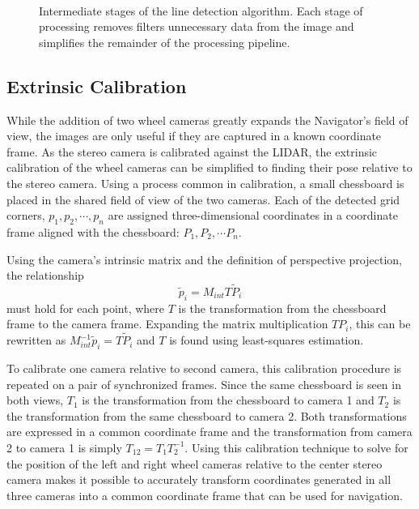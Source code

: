 \documentclass[twocolumn,11pt]{article}
\begin{document}
\begin{figure*}[t]
	\centering
	\\
	\caption{
		Intermediate stages of the line detection algorithm. Each stage of
		processing removes filters unnecessary data from the image and
		simplifies the remainder of the processing pipeline.
	}
	\label{fig:line-all}
\end{figure*}

\subsection{Extrinsic Calibration}
\label{sec:line-extrinsic}
While the addition of two wheel cameras greatly expands the Navigator's field
of view, the images are only useful if they are captured in a known coordinate
frame. As the stereo camera is calibrated against the LIDAR, the extrinsic
calibration of the wheel cameras can be simplified to finding their pose
relative to the stereo camera. Using a process common in calibration, a small
chessboard is placed in the shared field of view of the two cameras. Each of
the detected grid corners, $p_1, p_2, \cdots, p_n$ are assigned three-dimensional
coordinates in a coordinate frame aligned with the chessboard: $P_1, P_2, \cdots
P_n$.

Using the camera's intrinsic matrix and the definition of perspective projection,
the relationship
\begin{equation*}
	\tilde{p}_i = M_{int} T \tilde{P}_i
\end{equation*}
must hold for each point, where $T$ is the transformation from the chessboard
frame to the camera frame. Expanding the matrix multiplication $T P_i$, this
can be rewritten as $M_{int}^{-1} \tilde{p}_i = T \tilde{P}_i$ and $T$ is found
using least-squares estimation.

To calibrate one camera relative to second camera, this calibration procedure is
repeated on a pair of synchronized frames. Since the same chessboard is seen in both views,
$T_1$ is the transformation from the chessboard to camera 1 and $T_2$ is the
transformation from the same chessboard to camera 2. Both transformations are
expressed in a common coordinate frame and the transformation from camera 2 to camera
1 is simply $T_{12} = T_1 T_2^{-1}$. Using this calibration technique to solve for
the position of the left and right wheel cameras relative to the center stereo camera
makes it possible to accurately transform coordinates generated in all three cameras
into a common coordinate frame that can be used for navigation.
\end{document}
